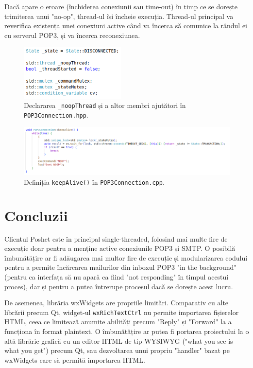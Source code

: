 \documentclass[runningheads]{llncs}
\begin{document}
Dacă apare o eroare (închiderea conexiunii sau time-out) în timp ce se dorește trimiterea unui "no-op", thread-ul își încheie execuția. Thread-ul principal va reverifica existența unei conexiuni active când va încerca să comunice la rândul ei cu serverul POP3, și va încerca reconexiunea.

\begin{figure}
    \centering
    \includegraphics[width={200px}]{noopThread.png}
    \caption{Declararea \texttt{\_noopThread} și a altor membri ajutători în \texttt{POP3Connection.hpp}.}
    \label{fig:noopThread}
\end{figure}

\begin{figure}
    \centering
    \includegraphics[width=\textwidth]{keepAlive.png}
    \caption{Definiția \texttt{keepAlive()} în \texttt{POP3Connection.cpp}.}
    \label{fig:keepalive}
\end{figure}

\section{Concluzii}

Clientul Poshet este în principal single-threaded, folosind mai multe fire de execuție doar pentru a menține active conexiunile POP3 și SMTP. O posibilă îmbunătățire ar fi adăugarea mai multor fire de execuție și modularizarea codului pentru a permite încărcarea mailurilor din inboxul POP3 "in the background" (pentru ca interfața să nu apară ca fiind "not responding" în timpul acestui proces), dar și pentru a putea întrerupe procesul dacă se dorește acest lucru.

De asemenea, librăria wxWidgets are propriile limitări. Comparativ cu alte librării precum Qt, widget-ul \texttt{wxRichTextCtrl} nu permite importarea fișierelor HTML, ceea ce limitează anumite abilități precum "Reply" și "Forward" la a funcționa în format plaintext. O îmbunătățire ar putea fi portarea proiectului la o altă librărie grafică cu un editor HTML de tip WYSIWYG ("what you see is what you get") precum Qt, sau dezvoltarea unui propriu "handler" bazat pe wxWidgets care să permită importarea HTML.
%
%
%
% 
% 
\end{document}
